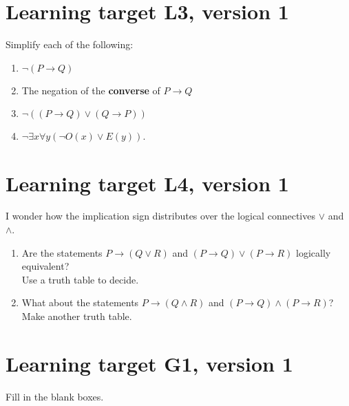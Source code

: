 \pagebreak
\section{Learning target L3, version 1}

Simplify each of the following:

\begin{enumerate}
    \item $\lnot(P\to Q)$ \vfill
    \item The negation of the \textbf{converse} of $P\to Q$\vfill
    \item $\lnot((P\to Q) \lor (Q\to P))$\vfill
    \item $\neg \exists x \forall y (\neg O(x) \vee E(y))\text{.}$\vfill
\end{enumerate}

\pagebreak
\section{Learning target L4, version 1}

I wonder how the implication sign distributes over the logical connectives $\lor$ and $\land$.

\begin{enumerate}
    \item Are the statements $P \to (Q\lor R)$ and $(P\to Q) \lor (P \to R)$ logically equivalent? \\
    Use a truth table to decide.
    \vfill
    \item What about the statements $P \to (Q\land R)$ and $(P\to Q) \land (P \to R)$? Make another truth table.
    \vfill
\end{enumerate}

\pagebreak
\section{Learning target G1, version 1}
Fill in the blank boxes.

